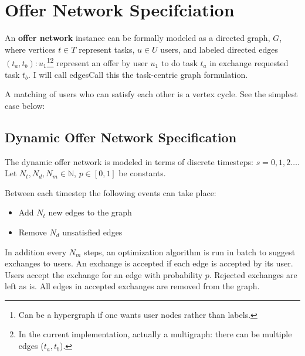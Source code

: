 \documentclass[main.tex]{subfiles}
\begin{document}
\section{Offer Network Specifciation}
An \textbf{offer network} instance can be formally modeled as a directed graph, $G$, where vertices $t \in T$ represent tasks, $u \in U$ users, and labeled directed edges $(t_a,t_b) : u_1$\footnote{Can be a hypergraph if one wants user nodes rather than labels.}\footnote{In the current implementation, actually a multigraph: there can be multiple edges ($t_a,t_b$).} represent an offer by user $u_1$ to do task $t_a$ in exchange requested task $t_b$. I will call edgesCall this the task-centric graph formulation.
\begin{center}
\end{center}

A matching of users who can satisfy each other is a vertex cycle. See the simplest case below:

\begin{center}
\end{center}

\subsection{Dynamic Offer Network Specification}
The dynamic offer network is modeled in terms of discrete timesteps: $s = 0, 1, 2 \dots$.
Let $N_t, N_d, N_m \in \mathbb{N}$, $p \in [0,1]$ be constants.

Between each timestep the following events can take place:
\begin{itemize}
  \item Add $N_t$ new edges to the graph
  \item Remove $N_d$ unsatisfied edges
\end{itemize}

In addition every $N_m$ steps, an optimization algorithm is run in batch to suggest exchanges to users. An exchange is accepted if each edge is accepted by its user. Users accept the exchange for an edge with probability $p$. Rejected exchanges are left as is. All edges in accepted exchanges are removed from the graph.
\end{document}
